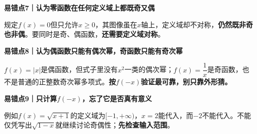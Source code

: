 \clearpage
\begin{trapbox}
\textbf{易错点7｜认为零函数在任何定义域上都既奇又偶}



规定$f(x)=0$但只允许$x\geq0$，其图像虽在$x$轴上，定义域却不对称，\textbf{仍然既非奇也非偶}。要同时是奇、偶函数，\textbf{还需要定义域对称}。

\medskip
\textbf{易错点8｜认为偶函数只能有偶次幂，奇函数只能有奇次幂}

$f(x)=|x|$是偶函数，但式子里没有$x^2$一类的偶次幂；$f(x)=\dfrac1x$是奇函数，也不是普通的正整数奇次幂多项式。\textbf{按$f(-x)$验证最可靠，别只靠外形猜。}

\medskip
\end{trapbox}
\clearpage
\begin{trapbox}
\textbf{易错点9｜只计算$f(-x)$，忘了它是否真有意义}



例如$f(x)=\sqrt{x+1}$的定义域为$[-1,+\infty)$，$x=2$能代入，而$-2$不能代入。不能仅凭写出$\sqrt{1-x}$就继续讨论奇偶性；\textbf{先检查输入范围}。
\end{trapbox}
